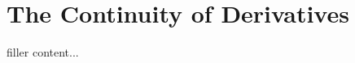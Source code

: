 \section{The Continuity of Derivatives}\label{sec:the-continuity-of-derivatives}

filler content...


